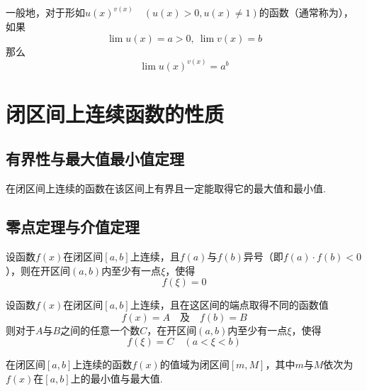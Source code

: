 \begin{definition}[幂指函数]
	一般地，对于形如\( u(x)^{v(x)}\quad(u(x) > 0, u(x) \neq 1) \)的函数（通常称为），如果
	\[ \lim u(x) = a > 0,\ \lim v(x) = b \]
	那么
	\[ \lim u(x)^{v(x)} = a^{b} \]
\end{definition}

\section{闭区间上连续函数的性质}

\subsection{有界性与最大值最小值定理}
\begin{theorem}[有界性与最大值最小值定理]
	在闭区间上连续的函数在该区间上有界且一定能取得它的最大值和最小值.
\end{theorem}

\subsection{零点定理与介值定理}

\begin{theorem}[零点定理]
	设函数\( f(x) \)在闭区间\( [a,b] \)上连续，且\( f(a) \)与\( f(b) \)异号（即\( f(a) \cdot f(b) < 0 \)），则在开区间\( (a,b) \)内至少有一点\( \xi \)，使得
	\[ f(\xi) = 0 \]
\end{theorem}

\begin{theorem}[介值定理]
	设函数\( f(x) \)在闭区间\( [a,b] \)上连续，且在这区间的端点取得不同的函数值
	\[ f(x) = A \quad \text{及}\quad f(b) = B \]
	则对于\( A \)与\( B \)之间的任意一个数\( C \)，在开区间\( (a,b) \)内至少有一点\( \xi \)，使得
	\[ f(\xi) = C \quad (a < \xi < b) \]
\end{theorem}

\begin{corollary}
	在闭区间\( [a,b] \)上连续的函数\( f(x) \)的值域为闭区间\( [m,M] \)，其中\( m \)与\( M \)依次为\( f(x) \)在\( [a,b] \)上的最小值与最大值.
\end{corollary}

%

\newpage
\begin{problemset}[错题集]
	\item 
\end{problemset}
